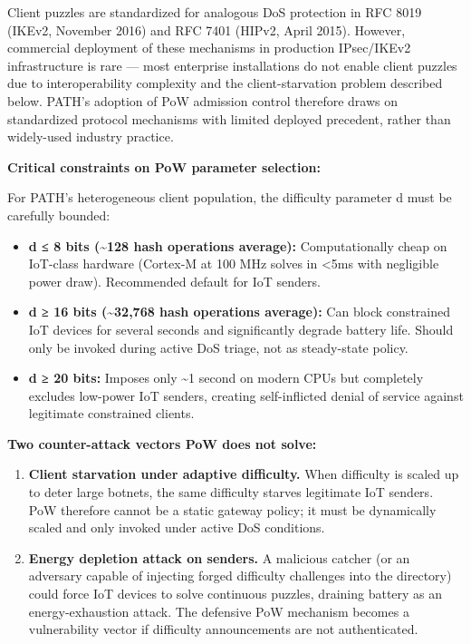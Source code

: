 \documentclass[
  11pt,
]{article}
\providecommand{\tightlist}{%
  \setlength{\itemsep}{0pt}\setlength{\parskip}{0pt}}
\begin{document}
Client puzzles are standardized for analogous DoS protection in RFC 8019
(IKEv2, November 2016) and RFC 7401 (HIPv2, April 2015). However,
commercial deployment of these mechanisms in production IPsec/IKEv2
infrastructure is rare --- most enterprise installations do not enable
client puzzles due to interoperability complexity and the
client-starvation problem described below. PATH's adoption of PoW
admission control therefore draws on standardized protocol mechanisms
with limited deployed precedent, rather than widely-used industry
practice.

\textbf{Critical constraints on PoW parameter selection:}

For PATH's heterogeneous client population, the difficulty parameter d
must be carefully bounded:

\begin{itemize}
\tightlist
\item
  \textbf{d ≤ 8 bits (\textasciitilde128 hash operations average):}
  Computationally cheap on IoT-class hardware (Cortex-M at 100 MHz
  solves in \textless5ms with negligible power draw). Recommended
  default for IoT senders.
\item
  \textbf{d ≥ 16 bits (\textasciitilde32,768 hash operations average):}
  Can block constrained IoT devices for several seconds and
  significantly degrade battery life. Should only be invoked during
  active DoS triage, not as steady-state policy.
\item
  \textbf{d ≥ 20 bits:} Imposes only \textasciitilde1 second on modern
  CPUs but completely excludes low-power IoT senders, creating
  self-inflicted denial of service against legitimate constrained
  clients.
\end{itemize}

\textbf{Two counter-attack vectors PoW does not solve:}

\begin{enumerate}
\def\labelenumi{\arabic{enumi}.}
\tightlist
\item
  \textbf{Client starvation under adaptive difficulty.} When difficulty
  is scaled up to deter large botnets, the same difficulty starves
  legitimate IoT senders. PoW therefore cannot be a static gateway
  policy; it must be dynamically scaled and only invoked under active
  DoS conditions.
\item
  \textbf{Energy depletion attack on senders.} A malicious catcher (or
  an adversary capable of injecting forged difficulty challenges into
  the directory) could force IoT devices to solve continuous puzzles,
  draining battery as an energy-exhaustion attack. The defensive PoW
  mechanism becomes a vulnerability vector if difficulty announcements
  are not authenticated.
\end{enumerate}
\end{document}
